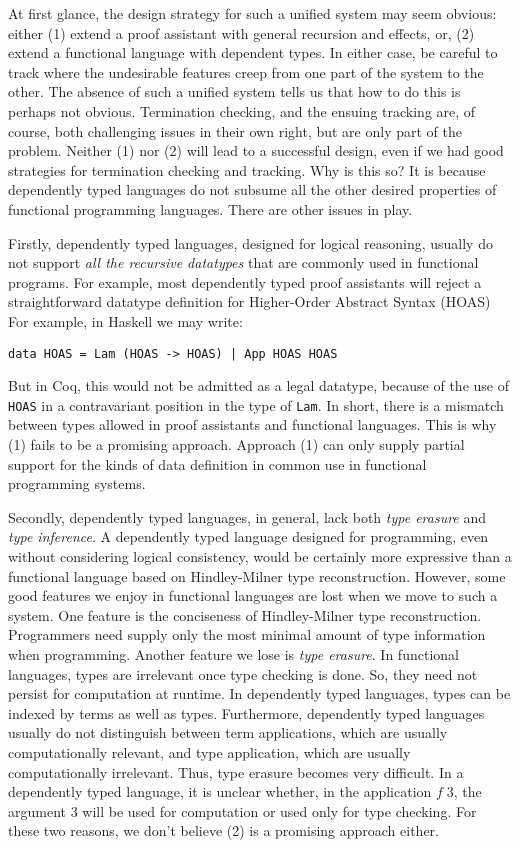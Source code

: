 At first glance, the design strategy for such a unified system may seem obvious:
either
(1) extend a proof assistant with general recursion and effects, or,
(2) extend a functional language with dependent types.
In either case, be careful to track where the undesirable features creep
from one part of the system to the other.
The absence of such a unified system tells us that how to do this is perhaps not obvious.
Termination checking, and the ensuing tracking are, of course, both challenging issues
in their own right, but are only part of the problem. Neither (1) nor (2) will
lead to a successful design, even if we had good strategies for
termination checking and tracking. Why is this so?
It is because dependently typed languages do not subsume
all the other desired properties of functional programming languages. There
are other issues in play.



Firstly, dependently typed languages, designed for logical reasoning, usually do
not support \emph{all the recursive datatypes} that are commonly used in functional programs.
For example, most dependently typed proof assistants will reject
a straightforward datatype definition for Higher-Order Abstract Syntax (HOAS)
For example, in Haskell we may write:
{\small\begin{verbatim}
data HOAS = Lam (HOAS -> HOAS) | App HOAS HOAS
\end{verbatim}}
But in Coq, this would not be admitted as a legal datatype, because of the
use of {\tt HOAS} in a contravariant position in the type of {\tt Lam}.
In short, there is a mismatch between types allowed in proof assistants and
functional languages. This is why (1) fails to be
a promising approach. Approach (1) can only supply partial support for the kinds
of data definition in common use in functional programming systems.

Secondly, dependently typed languages, in general, lack both \emph{type erasure} and
\emph{type inference}. A dependently typed language designed for programming, even
without considering logical consistency, would be certainly more expressive than a
functional language based on Hindley-Milner type reconstruction. However, some good
features we enjoy in functional languages are lost when we move to such a system. One
feature is the conciseness of Hindley-Milner type reconstruction. Programmers need
supply only the most minimal amount of type information when programming. Another
feature we lose is \emph{type erasure}. In functional languages, types are irrelevant
once type checking is done. So, they need not persist for computation at runtime. In
dependently typed languages, types can be indexed by terms as well as types.
Furthermore, dependently typed languages usually do not distinguish between term
applications, which are usually computationally relevant, and type application, which
are usually computationally irrelevant. Thus, type erasure becomes very difficult. In a
dependently typed language, it is unclear whether, in the application $f\;3$, the
argument $3$ will be used for computation or used only for type checking.
For these two reasons, we don't believe (2) is a promising approach either.

